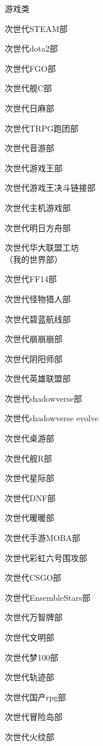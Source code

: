 \begin{multicols}{3}
    \begin{categorysection}{游戏类}
        \item 次世代STEAM部
        \item 次世代dota2部
        \item 次世代FGO部
        \item 次世代舰C部
        \item 次世代日麻部
        \item 次世代TRPG跑团部
        \item 次世代音游部
        \item 次世代游戏王部
        \item 次世代游戏王决斗链接部
        \item 次世代主机游戏部
        \item 次世代明日方舟部
        \item 次世代华大联盟工坊\\（我的世界部）
        \item 次世代FF14部
        \item 次世代怪物猎人部
        \item 次世代碧蓝航线部
        \item 次世代崩崩崩部
        \item 次世代阴阳师部
        \item 次世代英雄联盟部
        \item 次世代shadowverse部
        \item 次世代shadowverse evolve
        \item 次世代桌游部
        \item 次世代舰R部
        \item 次世代星际部
        \item 次世代DNF部
        \item 次世代暖暖部
        \item 次世代手游MOBA部
        \item 次世代彩虹六号围攻部
        \item 次世代CSGO部
        \item 次世代EnsembleStars部
        \item 次世代万智牌部
        \item 次世代文明部
        \item 次世代梦100部
        \item 次世代轨迹部
        \item 次世代国产rpg部
        \item 次世代冒险岛部
        \item 次世代火纹部

\end{categorysection}
\end{multicols}
